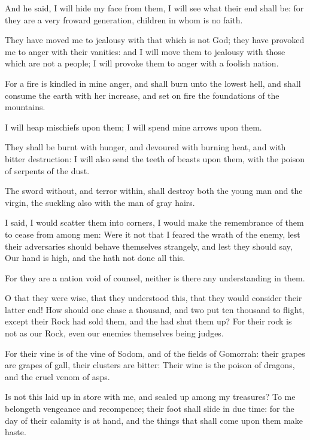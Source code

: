 \Verse And he said, I will hide my face from them, I will see what their end shall be: for they are a very froward generation, children in whom is no faith.

\Verse They have moved me to jealousy with that which is not God; they have provoked me to anger with their vanities: and I will move them to jealousy with those which are not a people; I will provoke them to anger with a foolish nation.

\Verse For a fire is kindled in mine anger, and shall burn unto the lowest hell, and shall consume the earth with her increase, and set on fire the foundations of the mountains.

\Verse I will heap mischiefs upon them; I will spend mine arrows upon them.

\Verse They shall be burnt with hunger, and devoured with burning heat, and with bitter destruction: I will also send the teeth of beasts upon them, with the poison of serpents of the dust.

\Verse The sword without, and terror within, shall destroy both the young man and the virgin, the suckling also with the man of gray hairs.

\Verse I said, I would scatter them into corners, I would make the remembrance of them to cease from among men: \Verse Were it not that I feared the wrath of the enemy, lest their adversaries should behave themselves strangely, and lest they should say, Our hand is high, and the \LORD hath not done all this.

\Verse For they are a nation void of counsel, neither is there any understanding in them.

\Verse O that they were wise, that they understood this, that they would consider their latter end!  \Verse How should one chase a thousand, and two put ten thousand to flight, except their Rock had sold them, and the \LORD had shut them up?  \Verse For their rock is not as our Rock, even our enemies themselves being judges.

\Verse For their vine is of the vine of Sodom, and of the fields of Gomorrah: their grapes are grapes of gall, their clusters are bitter: \Verse Their wine is the poison of dragons, and the cruel venom of asps.

\Verse Is not this laid up in store with me, and sealed up among my treasures?  \Verse To me belongeth vengeance and recompence; their foot shall slide in due time: for the day of their calamity is at hand, and the things that shall come upon them make haste.

